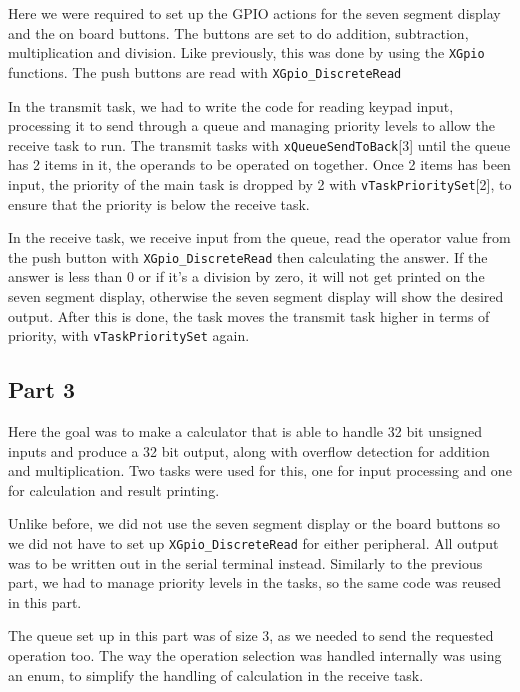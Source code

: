 \documentclass{article}
\begin{document}
Here we were required to set up the GPIO actions for the seven segment display and the on board buttons. The buttons are set to do addition, subtraction, multiplication and division. Like previously, this was done by using the \verb|XGpio| functions. The push buttons are read with \verb|XGpio_DiscreteRead|

In the transmit task, we had to write the code for reading keypad input, processing it to send through a queue and managing priority levels to allow the receive task to run. The transmit tasks with \verb|xQueueSendToBack|[3] until the queue has 2 items in it, the operands to be operated on together. Once 2 items has been input, the priority of the main task is dropped by 2 with \verb|vTaskPrioritySet|[2], to ensure that the priority is below the receive task.

In the receive task, we receive input from the queue, read the operator value from the push button with \verb|XGpio_DiscreteRead| then calculating the answer. If the answer is less than 0 or if it's a division by zero, it will not get printed on the seven segment display, otherwise the seven segment display will show the desired output. After this is done, the task moves the transmit task higher in terms of priority, with \verb|vTaskPrioritySet| again.

\subsection{Part 3}
Here the goal was to make a calculator that is able to handle 32 bit unsigned inputs and produce a 32 bit output, along with overflow detection for addition and multiplication. Two tasks were used for this, one for input processing and one for calculation and result printing.

Unlike before, we did not use the seven segment display or the board buttons so we did not have to set up \verb|XGpio_DiscreteRead| for either peripheral. All output was to be written out in the serial terminal instead. Similarly to the previous part, we had to manage priority levels in the tasks, so the same code was reused in this part.

The queue set up in this part was of size 3, as we needed to send the requested operation too. The way the operation selection was handled internally was using an enum, to simplify the handling of calculation in the receive task.
\end{document}
